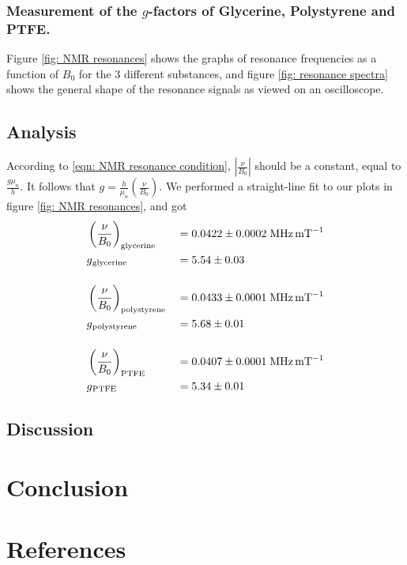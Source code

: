 \documentclass[a4paper]{jpconf}
\numberwithin{equation}{section}
\begin{document}
\subsubsection{Measurement of the $g$-factors of Glycerine, Polystyrene and PTFE.}

Figure \ref{fig: NMR resonances} shows the graphs of resonance frequencies as a function of $B_0$ for the 3 different substances, and
figure \ref{fig: resonance spectra} shows the general shape of the resonance signals as viewed on an oscilloscope.

\subsection{Analysis}
According to \eqref{eqn: NMR resonance condition}, $\left| \frac{\nu}{B_0} \right|$ should be a constant, equal to $\frac{g \mu_n}{h}$. It follows that $g = \frac{h}{\mu_n} \left( \frac{\nu}{B_0} \right)$. We performed a straight-line fit to our plots in figure \ref{fig: NMR resonances}, and got
\begin{alignat*}{2}
    &\left( \frac{\nu}{B_0} \right)_{\text{glycerine}} &&= 0.0422 \pm 0.0002 \; \si{\mega\hertz\per\milli\tesla} \\
	&g\textsubscript{glycerine} &&= 5.54 \pm 0.03 \\[12pt]
	&\left( \frac{\nu}{B_0} \right)_{\text{polystyrene}} &&= 0.0433 \pm 0.0001 \; \si{\mega\hertz\per\milli\tesla} \\
	&g\textsubscript{polystyrene} &&= 5.68 \pm 0.01 \\[12pt]
	&\left( \frac{\nu}{B_0} \right)_{\text{PTFE}} &&= 0.0407 \pm 0.0001 \; \si{\mega\hertz\per\milli\tesla} \\
	&g\textsubscript{PTFE} &&= 5.34 \pm 0.01 \\
\end{alignat*}

\subsection{Discussion}

\section{Conclusion}

\section*{References}
\begin{thebibliography}{9}
\end{thebibliography}
\end{document}
